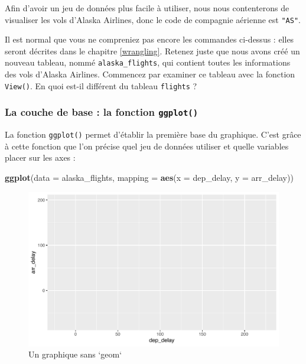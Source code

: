 \documentclass[a4paperpaper,]{article}
\newenvironment{Shaded}{\begin{snugshade}}{\end{snugshade}}
\newcommand{\KeywordTok}[1]{\textcolor[rgb]{0.13,0.29,0.53}{\textbf{#1}}}
\newcommand{\DataTypeTok}[1]{\textcolor[rgb]{0.13,0.29,0.53}{#1}}
\newcommand{\StringTok}[1]{\textcolor[rgb]{0.31,0.60,0.02}{#1}}
\newcommand{\OperatorTok}[1]{\textcolor[rgb]{0.81,0.36,0.00}{\textbf{#1}}}
\newcommand{\NormalTok}[1]{#1}
\theoremstyle{definition}
\theoremstyle{definition}
\theoremstyle{definition}
\theoremstyle{remark}
\begin{document}
Afin d'avoir un jeu de données plus facile à utiliser, nous nous
contenterons de visualiser les vols d'Alaska Airlines, donc le code de
compagnie aérienne est \texttt{"AS"}.

\begin{Shaded}
\end{Shaded}

Il est normal que vous ne compreniez pas encore les commandes ci-dessus
: elles seront décrites dans le chapitre \ref{wrangling}. Retenez juste
que nous avons créé un nouveau tableau, nommé \texttt{alaska\_flights},
qui contient toutes les informations des vols d'Alaska Airlines.
Commencez par examiner ce tableau avec la fonction \texttt{View()}. En
quoi est-il différent du tableau \texttt{flights} ?

\subsubsection{\texorpdfstring{La couche de base : la fonction
\texttt{ggplot()}}{La couche de base : la fonction ggplot()}}\label{la-couche-de-base-la-fonction-ggplot}

La fonction \texttt{ggplot()} permet d'établir la première base du
graphique. C'est grâce à cette fonction que l'on précise quel jeu de
données utiliser et quelle variables placer sur les axes :

\begin{Shaded}
\begin{Highlighting}[]
\KeywordTok{ggplot}\NormalTok{(}\DataTypeTok{data =}\NormalTok{ alaska_flights, }\DataTypeTok{mapping =} \KeywordTok{aes}\NormalTok{(}\DataTypeTok{x =}\NormalTok{ dep_delay, }\DataTypeTok{y =}\NormalTok{ arr_delay))}
\end{Highlighting}
\end{Shaded}

\begin{figure}[htpb]

{\centering \includegraphics[width=0.9\linewidth]{figure/unnamed-chunk-37-1} 

}

\caption{Un graphique sans `geom`}\label{fig:unnamed-chunk-37}
\end{figure}
\end{document}
